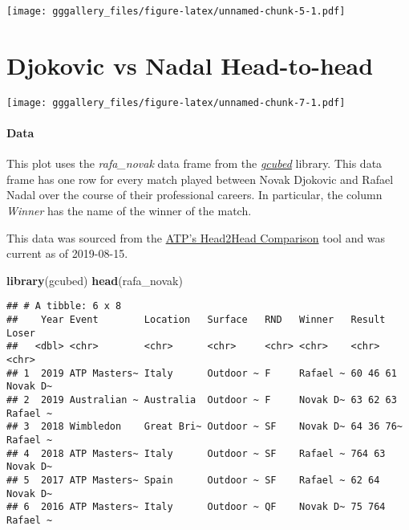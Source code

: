 \documentclass[]{book}
\newenvironment{Shaded}{\begin{snugshade}}{\end{snugshade}}
\newcommand{\KeywordTok}[1]{\textcolor[rgb]{0.13,0.29,0.53}{\textbf{#1}}}
\newcommand{\NormalTok}[1]{#1}
\begin{document}
\texttt{[image: gggallery\_files/figure-latex/unnamed-chunk-5-1.pdf]}

\hypertarget{djokovicnadal}{%
\chapter*{Djokovic vs Nadal Head-to-head}\label{djokovicnadal}}

\texttt{[image: gggallery\_files/figure-latex/unnamed-chunk-7-1.pdf]}

\hypertarget{djokovicnadaldata}{%
\subsubsection*{Data}\label{djokovicnadaldata}}

This plot uses the \emph{rafa\_novak} data frame from the \protect\hyperlink{gcubed}{\emph{gcubed}} library. This data frame has one row for every match played between Novak Djokovic and Rafael Nadal over the course of their professional careers. In particular, the column \emph{Winner} has the name of the winner of the match.

This data was sourced from the \href{https://www.atptour.com/en/players/fedex-head-2-head/rafael-nadal-vs-novak-djokovic/N409/D643}{ATP's Head2Head Comparison} tool and was current as of 2019-08-15.

\begin{Shaded}
\begin{Highlighting}[]
\KeywordTok{library}\NormalTok{(gcubed)}
\KeywordTok{head}\NormalTok{(rafa_novak)}
\end{Highlighting}
\end{Shaded}

\begin{verbatim}
## # A tibble: 6 x 8
##    Year Event        Location   Surface   RND   Winner   Result    Loser   
##   <dbl> <chr>        <chr>      <chr>     <chr> <chr>    <chr>     <chr>   
## 1  2019 ATP Masters~ Italy      Outdoor ~ F     Rafael ~ 60 46 61  Novak D~
## 2  2019 Australian ~ Australia  Outdoor ~ F     Novak D~ 63 62 63  Rafael ~
## 3  2018 Wimbledon    Great Bri~ Outdoor ~ SF    Novak D~ 64 36 76~ Rafael ~
## 4  2018 ATP Masters~ Italy      Outdoor ~ SF    Rafael ~ 764 63    Novak D~
## 5  2017 ATP Masters~ Spain      Outdoor ~ SF    Rafael ~ 62 64     Novak D~
## 6  2016 ATP Masters~ Italy      Outdoor ~ QF    Novak D~ 75 764    Rafael ~
\end{verbatim}
\end{document}
